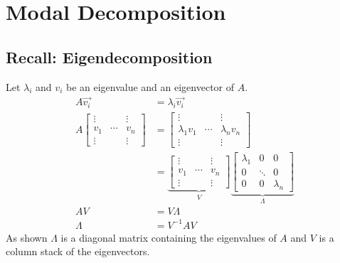 \section{Modal Decomposition}

\subsection{Recall: Eigendecomposition}
Let $\lambda_i$ and $v_i$ be an eigenvalue and an eigenvector of $A$.
\begin{align*}
    A \vec{v_i} & = \lambda_i \vec{v_i}                    \\
    A \begin{bmatrix}
          \vdots &        & \vdots \\
          v_1    & \cdots & v_n    \\
          \vdots &        & \vdots
      \end{bmatrix}
                & = \begin{bmatrix}
                        \vdots        &        & \vdots        \\
                        \lambda_1 v_1 & \cdots & \lambda_n v_n \\
                        \vdots        &        & \vdots
                    \end{bmatrix} \\
                & = \underbrace{\begin{bmatrix}
                                        \vdots &        & \vdots \\
                                        v_1    & \cdots & v_n    \\
                                        \vdots &        & \vdots
                                    \end{bmatrix}}_{V}
    \underbrace{\begin{bmatrix}
                        \lambda_1 & 0      & 0         \\
                        0         & \ddots & 0         \\
                        0         & 0      & \lambda_n
                    \end{bmatrix}}_{\Lambda}             \\
    AV          & = V\Lambda                               \\
    \Lambda     & = V^{-1}AV
\end{align*}
As shown $\Lambda$ is a diagonal matrix containing the eigenvalues of $A$ and $V$ is a column stack of the eigenvectors.

